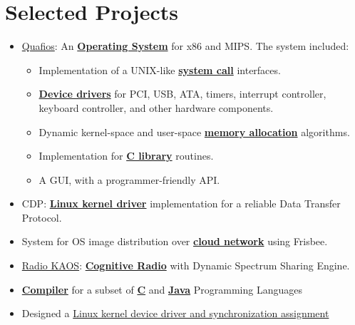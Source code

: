 \documentclass[letterpaper]{twentysecondcv} %
\begin{document}

\section{Selected Projects}

\begin{itemize}
    \item{\href{https://github.com/quafios/quafios}{Quafios}:
          An \textbf{\underline{Operating System}} for x86 and MIPS. The system included:
          \begin{itemize}
            \item Implementation of a UNIX-like \textbf{\underline{system call}} interfaces.
            \item \textbf{\underline{Device drivers}} for PCI, USB, ATA, timers, interrupt controller,
                  keyboard controller, and other hardware components.
            \item Dynamic kernel-space and user-space \textbf{\underline{memory allocation}} algorithms.
            \item Implementation for \textbf{\underline{C library}} routines.
            \item A GUI, with a programmer-friendly API.
          \end{itemize}
          }
    \item{CDP: \textbf{\underline{Linux kernel driver}} implementation for a reliable Data Transfer Protocol.}
    \item{System for OS image distribution over \textbf{\underline{cloud network}} using Frisbee.} 
    \item{\href{https://github.com/iocoder/wncp}{Radio KAOS}: \textbf{\underline{Cognitive Radio}} with Dynamic Spectrum Sharing Engine.}
    \item{\textbf{\underline{Compiler}} for a subset of \textbf{\underline{C}} and
          \textbf{\underline{Java}} Programming Languages}
    \item{Designed a \href{https://github.com/iocoder/cs333_f16_lab2/raw/master/CS333_F16_Lab2.pdf}{Linux kernel device driver and synchronization assignment}
}
\end{itemize}
\end{document}
